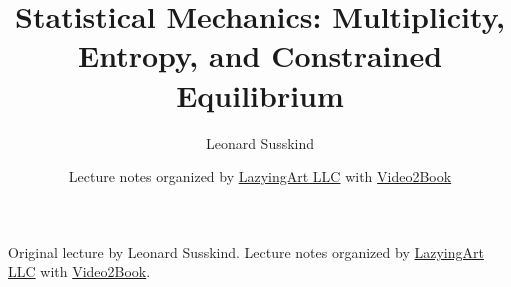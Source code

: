 \documentclass[11pt,oneside]{book}
\begin{document}
\frontmatter
\hypersetup{pageanchor=false}
\title{Statistical Mechanics: Multiplicity, Entropy, and Constrained Equilibrium}
\author{Leonard Susskind}
\date{Lecture notes organized by \href{https://lazying.art}{LazyingArt LLC} with \href{https://github.com/lachlanchen/Video2Book}{Video2Book}}
\maketitle
\begin{center}
\small Original lecture by Leonard Susskind. Lecture notes organized by \href{https://lazying.art}{LazyingArt LLC} with \href{https://github.com/lachlanchen/Video2Book}{Video2Book}.
\end{center}
\clearpage
\hypersetup{pageanchor=true}
\mainmatter

\end{document}
